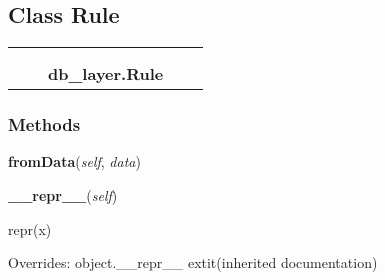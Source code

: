 

\subsection{Class Rule}

    \label{db_layer:Rule}
\begin{tabular}{cccccc}
\multicolumn{2}{r}{\settowidth{\BCL}{object}\multirow{2}{\BCL}{object}}
&&
  \\\cline{3-3}
  &&\multicolumn{1}{c|}{}
&&
  \\
&&\multicolumn{2}{l}{\textbf{db\_layer.Rule}}
\end{tabular}



  \subsubsection{Methods}

    \label{db_layer:Rule:fromData}

    \vspace{0.5ex}

\hspace{.8\funcindent}\begin{boxedminipage}{\funcwidth}

    \raggedright \textbf{fromData}(\textit{self}, \textit{data})

\setlength{\parskip}{2ex}
\setlength{\parskip}{1ex}
    \end{boxedminipage}

    \vspace{0.5ex}

\hspace{.8\funcindent}\begin{boxedminipage}{\funcwidth}

    \raggedright \textbf{\_\_repr\_\_}(\textit{self})

\setlength{\parskip}{2ex}
    repr(x)

\setlength{\parskip}{1ex}
      Overrides: object.\_\_repr\_\_ 	extit{(inherited documentation)}

    \end{boxedminipage}

